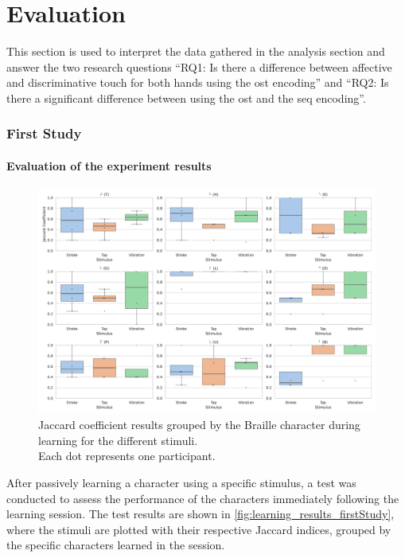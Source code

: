 \chapter{Evaluation}
\label{ch:Evaluation}

This section is used to interpret the data gathered in the analysis section and answer the two research questions \enquote{RQ1: Is there a difference between affective and discriminative touch for
both hands using the \gls{ost} encoding} and
\enquote{RQ2: Is there a significant
difference between using the \gls{ost} and the \gls{seq} encoding}.


\subsection{First Study}

\subsubsection{Evaluation of the experiment results}

\begin{figure}
    \centering
    \includegraphics[width=\linewidth]{src/pictures/Study1Data_Experiment/Test_single_char.pdf}
    \caption{Jaccard coefficient results grouped by the Braille character during learning  for the different stimuli.\\Each dot represents one participant.}
    \label{fig:learning_results_firstStudy}
\end{figure}

After passively learning a character using a specific stimulus, a test was conducted to assess the performance of the characters immediately following the learning session. 
The test results are shown in \autoref{fig:learning_results_firstStudy}, where the stimuli are plotted with their respective Jaccard indices, grouped by the specific characters learned in the session.

